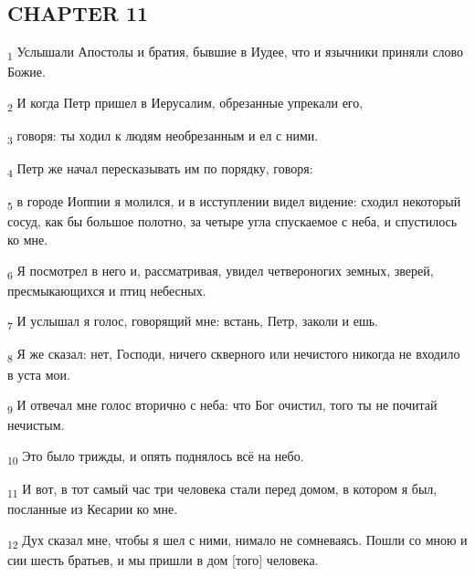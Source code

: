 \subsection{CHAPTER 11}
\begin{tcolorbox}
\textsubscript{1} Услышали Апостолы и братия, бывшие в Иудее, что и язычники приняли слово Божие.
\end{tcolorbox}
\begin{tcolorbox}
\textsubscript{2} И когда Петр пришел в Иерусалим, обрезанные упрекали его,
\end{tcolorbox}
\begin{tcolorbox}
\textsubscript{3} говоря: ты ходил к людям необрезанным и ел с ними.
\end{tcolorbox}
\begin{tcolorbox}
\textsubscript{4} Петр же начал пересказывать им по порядку, говоря:
\end{tcolorbox}
\begin{tcolorbox}
\textsubscript{5} в городе Иоппии я молился, и в исступлении видел видение: сходил некоторый сосуд, как бы большое полотно, за четыре угла спускаемое с неба, и спустилось ко мне.
\end{tcolorbox}
\begin{tcolorbox}
\textsubscript{6} Я посмотрел в него и, рассматривая, увидел четвероногих земных, зверей, пресмыкающихся и птиц небесных.
\end{tcolorbox}
\begin{tcolorbox}
\textsubscript{7} И услышал я голос, говорящий мне: встань, Петр, заколи и ешь.
\end{tcolorbox}
\begin{tcolorbox}
\textsubscript{8} Я же сказал: нет, Господи, ничего скверного или нечистого никогда не входило в уста мои.
\end{tcolorbox}
\begin{tcolorbox}
\textsubscript{9} И отвечал мне голос вторично с неба: что Бог очистил, того ты не почитай нечистым.
\end{tcolorbox}
\begin{tcolorbox}
\textsubscript{10} Это было трижды, и опять поднялось всё на небо.
\end{tcolorbox}
\begin{tcolorbox}
\textsubscript{11} И вот, в тот самый час три человека стали перед домом, в котором я был, посланные из Кесарии ко мне.
\end{tcolorbox}
\begin{tcolorbox}
\textsubscript{12} Дух сказал мне, чтобы я шел с ними, нимало не сомневаясь. Пошли со мною и сии шесть братьев, и мы пришли в дом [того] человека.
\end{tcolorbox}
